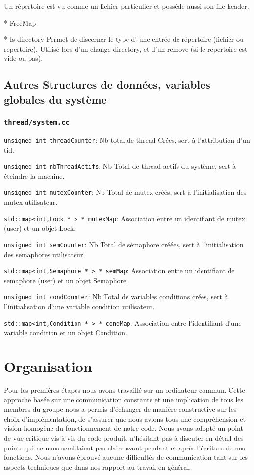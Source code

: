 \documentclass[11pt]{article}
\begin{document}
Un répertoire est vu comme un fichier particulier et possède aussi son file header.
 
* FreeMap

* Is directory
Permet de discerner le type d' une entrée de répertoire (fichier ou repertoire).
Utilisé lors d'un change directory, et d'un remove (si le repertoire est vide ou pas).

\subsection{Autres Structures de données, variables globales du système}
\subsubsection{\texttt{thread/system.cc}}
\texttt{unsigned int threadCounter}: Nb total de thread Crées, sert à l'attribution d'un tid.

\texttt{unsigned int nbThreadActifs}: Nb Total de thread actifs du système, sert à éteindre la machine.

\texttt{unsigned int mutexCounter}: Nb Total de mutex créés, sert à l'initialisation des mutex utilisateur.

\texttt{std::map<int,Lock * > * mutexMap}: Association entre un identifiant de mutex (user) et un objet Lock.

\texttt{unsigned int semCounter}: Nb Total de sémaphore créées, sert à l'initialisation des semaphores utilisateur.

\texttt{std::map<int,Semaphore * > * semMap}: Association entre un identifiant de semaphore (user) et un objet Semaphore.

\texttt{unsigned int condCounter}: Nb Total de variables conditions crées, sert à l'initialisation d'une variable
condition utilisateur.

\texttt{std::map<int,Condition * > * condMap}: Association entre l'identifiant d'une variable condition et
un objet Condition.


\section{Organisation}
Pour les premières étapes nous avons travaillé sur un ordinateur commun.
Cette approche basée sur une communication constante et une implication de tous les membres du groupe
nous a permis d'échanger de manière constructive sur les choix d'implémentation, de s'assurer que
nous avions tous une compréhension et vision homogène du fonctionnement de notre code. Nous
avons adopté un point de vue critique vis à vis du code produit,
n'hésitant pas à discuter en détail des points qui ne nous semblaient pas clairs
avant pendant et après l'écriture de nos fonctions. Nous n'avons éprouvé aucune difficultés de communication
tant sur les aspects techniques que dans nos rapport au travail en général.
\end{document}
